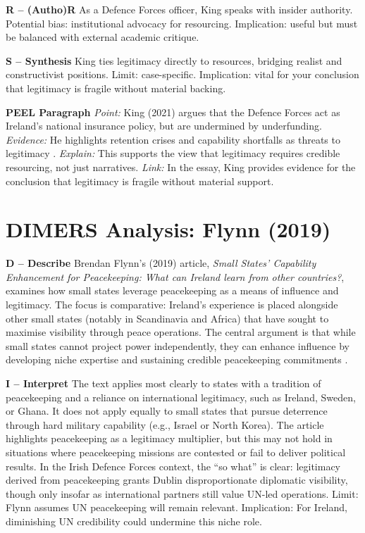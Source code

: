 \textbf{R – (Autho)R}  
As a Defence Forces officer, King speaks with insider authority. Potential bias: institutional advocacy for resourcing. Implication: useful but must be balanced with external academic critique.

\textbf{S – Synthesis}  
King ties legitimacy directly to resources, bridging realist and constructivist positions. Limit: case-specific. Implication: vital for your conclusion that legitimacy is fragile without material backing.

\textbf{PEEL Paragraph}  
\textit{Point:} King (2021) argues that the Defence Forces act as Ireland’s national insurance policy, but are undermined by underfunding.  
\textit{Evidence:} He highlights retention crises and capability shortfalls as threats to legitimacy \parencite{KING_2021}.  
\textit{Explain:} This supports the view that legitimacy requires credible resourcing, not just narratives.  
\textit{Link:} In the essay, King provides evidence for the conclusion that legitimacy is fragile without material support.  
  
\section*{DIMERS Analysis: Flynn (2019)}

\textbf{D – Describe}  
Brendan Flynn’s (2019) article, \textit{Small States’ Capability Enhancement for Peacekeeping: What can Ireland learn from other countries?}, examines how small states leverage peacekeeping as a means of influence and legitimacy. The focus is comparative: Ireland’s experience is placed alongside other small states (notably in Scandinavia and Africa) that have sought to maximise visibility through peace operations. The central argument is that while small states cannot project power independently, they can enhance influence by developing niche expertise and sustaining credible peacekeeping commitments \parencite{FLYNN_2019}.

\textbf{I – Interpret}  
The text applies most clearly to states with a tradition of peacekeeping and a reliance on international legitimacy, such as Ireland, Sweden, or Ghana. It does not apply equally to small states that pursue deterrence through hard military capability (e.g., Israel or North Korea). The article highlights peacekeeping as a legitimacy multiplier, but this may not hold in situations where peacekeeping missions are contested or fail to deliver political results. In the Irish Defence Forces context, the “so what” is clear: legitimacy derived from peacekeeping grants Dublin disproportionate diplomatic visibility, though only insofar as international partners still value UN-led operations. Limit: Flynn assumes UN peacekeeping will remain relevant. Implication: For Ireland, diminishing UN credibility could undermine this niche role.

